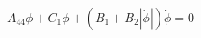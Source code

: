 \begin{equation} \label{eq:roll_decay_equation_himeno_quadratic_b}
A_{44} \ddot{\phi} + C_{1} \phi + \left(B_{1} + B_{2} \left|{\dot{\phi}}\right|\right) \dot{\phi} = 0
\end{equation}
